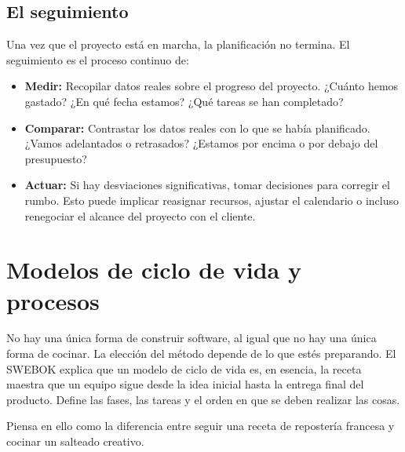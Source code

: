 \subsection*{El seguimiento}
Una vez que el proyecto está en marcha, la planificación no termina. 
El seguimiento es el proceso continuo de:
\begin{itemize}
  \item \textbf{Medir:} Recopilar datos reales sobre el progreso del proyecto. ¿Cuánto hemos gastado? ¿En qué fecha estamos? ¿Qué tareas se han completado?
  \item \textbf{Comparar:} Contrastar los datos reales con lo que se había planificado. ¿Vamos adelantados o retrasados? ¿Estamos por encima o por debajo del presupuesto?
  \item \textbf{Actuar:} Si hay desviaciones significativas, tomar decisiones para corregir el rumbo. Esto puede implicar reasignar recursos, ajustar el calendario o incluso renegociar el alcance del proyecto con el cliente.
\end{itemize}

\section{Modelos de ciclo de vida y procesos}
No hay una única forma de construir software, al igual que no hay una única forma de cocinar. 
La elección del método depende de lo que estés preparando. 
El SWEBOK explica que un modelo de ciclo de vida es, en esencia, la receta maestra que un equipo sigue desde la idea inicial hasta la entrega final del producto. 
Define las fases, las tareas y el orden en que se deben realizar las cosas.

Piensa en ello como la diferencia entre seguir una receta de repostería francesa y cocinar un salteado creativo.

